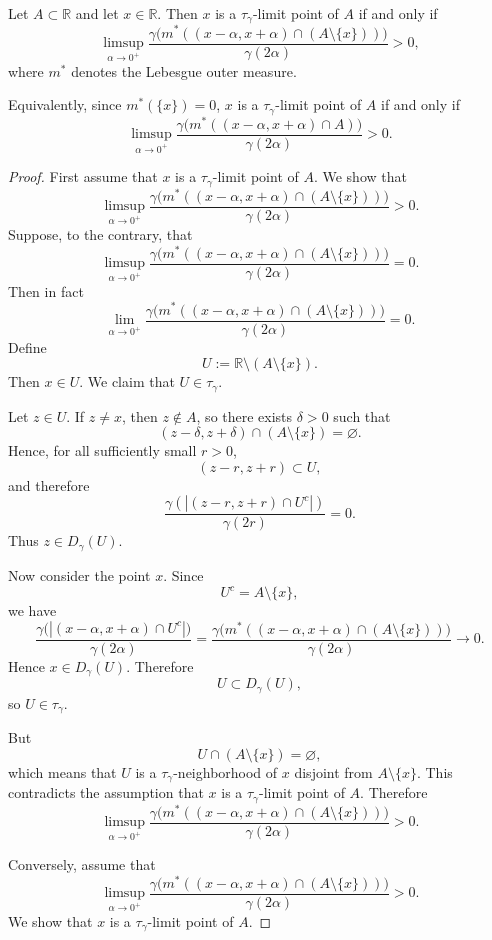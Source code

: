 \documentclass[10pt,a4paper]{amsart}
\begin{document}
\begin{theorem}
Let $A \subset \mathbb{R}$ and let $x \in \mathbb{R}$. Then $x$ is a $\tau_{\gamma}$-limit point of $A$ if and only if
$$
\limsup_{\alpha \to 0^+}
\frac{\gamma\bigl(m^*((x-\alpha,x+\alpha)\cap (A\setminus\{x\}))\bigr)}{\gamma(2\alpha)}
>0,
$$
where $m^*$ denotes the Lebesgue outer measure.

Equivalently, since $m^*(\{x\})=0$, $x$ is a $\tau_{\gamma}$-limit point of $A$ if and only if
$$
\limsup_{\alpha \to 0^+}
\frac{\gamma\bigl(m^*((x-\alpha,x+\alpha)\cap A)\bigr)}{\gamma(2\alpha)}
>0.
$$
\end{theorem}

\begin{proof}
First assume that $x$ is a $\tau_{\gamma}$-limit point of $A$. We show that
$$
\limsup_{\alpha \to 0^+}
\frac{\gamma\bigl(m^*((x-\alpha,x+\alpha)\cap (A\setminus\{x\}))\bigr)}{\gamma(2\alpha)}
>0.
$$
Suppose, to the contrary, that
$$
\limsup_{\alpha \to 0^+}
\frac{\gamma\bigl(m^*((x-\alpha,x+\alpha)\cap (A\setminus\{x\}))\bigr)}{\gamma(2\alpha)}
=0.
$$
Then in fact
$$
\lim_{\alpha \to 0^+}
\frac{\gamma\bigl(m^*((x-\alpha,x+\alpha)\cap (A\setminus\{x\}))\bigr)}{\gamma(2\alpha)}
=0.
$$
Define
$$
U:=\mathbb{R}\setminus (A\setminus\{x\}).
$$
Then $x\in U$. We claim that $U\in\tau_{\gamma}$.

Let $z\in U$. If $z\neq x$, then $z\notin A$, so there exists $\delta>0$ such that
$$
(z-\delta,z+\delta)\cap (A\setminus\{x\})=\varnothing.
$$
Hence, for all sufficiently small $r>0$,
$$
(z-r,z+r)\subset U,
$$
and therefore
$$
\frac{\gamma(|(z-r,z+r)\cap U^c|)}{\gamma(2r)}=0.
$$
Thus $z\in D_{\gamma}(U)$.

Now consider the point $x$. Since
$$
U^c=A\setminus\{x\},
$$
we have
$$
\frac{\gamma\bigl(|(x-\alpha,x+\alpha)\cap U^c|\bigr)}{\gamma(2\alpha)}
=
\frac{\gamma\bigl(m^*((x-\alpha,x+\alpha)\cap (A\setminus\{x\}))\bigr)}{\gamma(2\alpha)}
\to 0.
$$
Hence $x\in D_{\gamma}(U)$. Therefore
$$
U\subset D_{\gamma}(U),
$$
so $U\in\tau_{\gamma}$.

But
$$
U\cap (A\setminus\{x\})=\varnothing,
$$
which means that $U$ is a $\tau_{\gamma}$-neighborhood of $x$ disjoint from $A\setminus\{x\}$. This contradicts the assumption that $x$ is a $\tau_{\gamma}$-limit point of $A$. Therefore
$$
\limsup_{\alpha \to 0^+}
\frac{\gamma\bigl(m^*((x-\alpha,x+\alpha)\cap (A\setminus\{x\}))\bigr)}{\gamma(2\alpha)}
>0.
$$

Conversely, assume that
$$
\limsup_{\alpha \to 0^+}
\frac{\gamma\bigl(m^*((x-\alpha,x+\alpha)\cap (A\setminus\{x\}))\bigr)}{\gamma(2\alpha)}
>0.
$$
We show that $x$ is a $\tau_{\gamma}$-limit point of $A$.


\end{proof}
\end{document}
